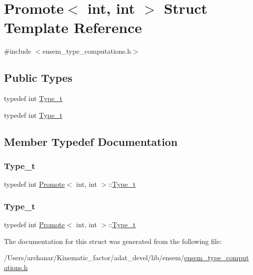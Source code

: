 \hypertarget{structPromote_3_01int_00_01int_01_4}{}\section{Promote$<$ int, int $>$ Struct Template Reference}
\label{structPromote_3_01int_00_01int_01_4}


{\ttfamily \#include $<$ensem\+\_\+type\+\_\+computations.\+h$>$}

\subsection*{Public Types}
\begin{DoxyCompactItemize}
\item 
typedef int \mbox{\hyperlink{structPromote_3_01int_00_01int_01_4_ad4def87f556a8315eb477252cb57c27b}{Type\+\_\+t}}
\item 
typedef int \mbox{\hyperlink{structPromote_3_01int_00_01int_01_4_ad4def87f556a8315eb477252cb57c27b}{Type\+\_\+t}}
\end{DoxyCompactItemize}


\subsection{Member Typedef Documentation}
\mbox{\label{structPromote_3_01int_00_01int_01_4_ad4def87f556a8315eb477252cb57c27b}} 
\subsubsection{\texorpdfstring{Type\_t}{Type\_t}\hspace{0.1cm}{\footnotesize\ttfamily [1/2]}}
{\footnotesize\ttfamily typedef int \mbox{\hyperlink{structPromote}{Promote}}$<$ int, int $>$\+::\mbox{\hyperlink{structPromote_3_01int_00_01int_01_4_ad4def87f556a8315eb477252cb57c27b}{Type\+\_\+t}}}

\mbox{\label{structPromote_3_01int_00_01int_01_4_ad4def87f556a8315eb477252cb57c27b}} 
\subsubsection{\texorpdfstring{Type\_t}{Type\_t}\hspace{0.1cm}{\footnotesize\ttfamily [2/2]}}
{\footnotesize\ttfamily typedef int \mbox{\hyperlink{structPromote}{Promote}}$<$ int, int $>$\+::\mbox{\hyperlink{structPromote_3_01int_00_01int_01_4_ad4def87f556a8315eb477252cb57c27b}{Type\+\_\+t}}}



The documentation for this struct was generated from the following file\+:\begin{DoxyCompactItemize}
\item 
/\+Users/archanar/\+Kinematic\+\_\+factor/adat\+\_\+devel/lib/ensem/\mbox{\hyperlink{lib_2ensem_2ensem__type__computations_8h}{ensem\+\_\+type\+\_\+computations.\+h}}\end{DoxyCompactItemize}
